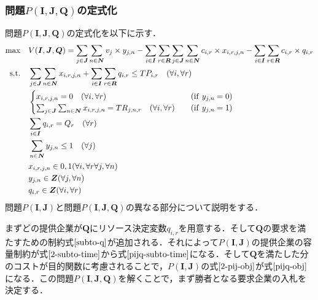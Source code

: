 \hypertarget{ux554fux984cpboldsymboliboldsymboljboldsymbolqux306eux5b9aux5f0fux5316}{%
\subsubsection{\texorpdfstring{問題\(P(\boldsymbol{I},\boldsymbol{J},\boldsymbol{Q})\)の定式化}{問題P(\textbackslash boldsymbol\{I\},\textbackslash boldsymbol\{J\},\textbackslash boldsymbol\{Q\})の定式化}}\label{ux554fux984cpboldsymboliboldsymboljboldsymbolqux306eux5b9aux5f0fux5316}}

問題\(P(\boldsymbol{I},\boldsymbol{J},\boldsymbol{Q})\)の定式化を以下に示す．
\begin{align}
  {\rm max} \quad &V(\boldsymbol{I},\boldsymbol{J} ,\boldsymbol{Q})=\sum_{j\in \boldsymbol{J}}\sum_{n\in\boldsymbol{N}}v_{j} \times y_{j,n} - \sum_{i\in\boldsymbol{I}}\sum_{r\in\boldsymbol{R}}\sum_{j\in\boldsymbol{J}}\sum_{n\in\boldsymbol{N}}c_{i,r} \times x_{i,r,j,n} - \sum_{i\in\boldsymbol{I}}\sum_{r\in\boldsymbol{R}}c_{i,r} \times q_{i,r} \label{pijq-obj}\\ 
  {\rm s.t.} \quad &\sum_{j\in \boldsymbol{J}}\sum_{n\in\boldsymbol{N}}x_{i,r,j,n}
  +\sum_{i\in\boldsymbol{I}}\sum_{r\in\boldsymbol{R}} q_{i,r}\leq TP_{i,r} \quad (\forall i, \forall r) \label{pijq-subto-time}\\
  &\begin{cases}
    x_{i,r,j,n} = 0 \quad (\forall i,\forall r) \quad &({\rm if} \ y_{j,n}=0) \\
    \sum_{j \in \boldsymbol{J}}\sum_{n \in \boldsymbol{N}} x_{i,r,j,n} = TR_{j,n,r} \quad (\forall i, \forall r) 
    \quad  &({\rm if} \ y_{j,n}=1) 
  \end{cases}
  \\
  &\sum_{i\in\boldsymbol{I}} q_{i,r}=Q_{r} \quad (\forall r) \label{subto-q}\\
  &\sum_{n \in \boldsymbol{N}}y_{j,n}  \leq 1 \quad (\forall j) \\
  &x_{i,r,j,n}\in {0,1} (\forall i,\forall r\forall j,\forall n )\\
  &y_{j,n} \in \boldsymbol{Z} (\forall j,\forall n ) \\
  &q_{i,r} \in \boldsymbol{Z} (\forall i,\forall r )
\end{align}
問題\(P(\boldsymbol{I},\boldsymbol{J})\)と問題\(P(\boldsymbol{I},\boldsymbol{J},\boldsymbol{Q})\)の異なる部分について説明をする．

まずどの提供企業が\(\boldsymbol {Q}\)にリソース決定変数\(q_{i,r}\)を用意する．そして\(\boldsymbol{Q}\)の要求を満たすための制約式\(\eqref{subto-q}\)が追加される．それによって\(P(\boldsymbol{I},\boldsymbol{J})\)の提供企業の容量制約が式\(\eqref{2-subto-time}\)から式\(\eqref{pijq-subto-time}\)になる．そして\(\boldsymbol{Q}\)を満たした分のコストが目的関数に考慮されることで，\(P(\boldsymbol{I},\boldsymbol{J})\)の式\(\eqref{2-pij-obj}\)が式\(\eqref{pijq-obj}\)になる．この問題\(P(\boldsymbol{I},\boldsymbol{J},\boldsymbol{Q})\)を解くことで，まず勝者となる要求企業の入札を決定する．

